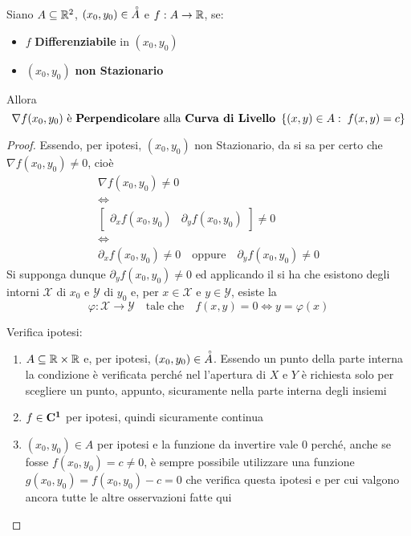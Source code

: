 \begin{proposition}
	\label{prop:curv_liv_perp_grad}
	Siano $A \subseteq \mathbb{R}^2$, $(x_0, y_0) \in \accentset{\circ}{A}$ e $f: A \to \mathbb{R}$, se:
	\begin{itemize}
		\item $f$ \textbf{Differenziabile} in $(x_0, y_0)$
		\item $(x_0, y_0)$ \textbf{non Stazionario}
	\end{itemize}
	Allora
	\[\nabla f(x_0, y_0) \text{ è \textbf{Perpendicolare} alla \textbf{Curva di Livello} } \left\{(x,y) \in A:\; f(x,y) = c\right\}\]
	\begin{proof}
		Essendo, per ipotesi, $(x_0, y_0)$ non Stazionario, da  si sa per certo che $\nabla f(x_0, y_0) \neq 0$, cioè
		\[
			\begin{gathered}
				\nabla f(x_0, y_0) \neq 0\\
				\iff\\
				\begin{bmatrix}
					\partial_x f(x_0, y_0) & \partial_y f(x_0, y_0)
				\end{bmatrix}
				\neq 0\\
				\iff\\
				\partial_x f(x_0, y_0) \neq 0 \quad \text{oppure} \quad \partial_y f(x_0, y_0) \neq 0
			\end{gathered}
		\]
		Si supponga dunque $\partial_y f(x_0,y_0) \neq 0$ ed applicando il  si ha che esistono degli intorni $\mathcal{X}$ di $x_0$ e $\mathcal{Y}$ di $y_0$ e, per $x \in \mathcal{X}$ e $y \in \mathcal{Y}$, esiste la
		\[\varphi: \mathcal{X} \to \mathcal{Y} \quad \text{tale che} \quad f(x,y) = 0 \iff y = \varphi(x)\]
		\vspace*{-\baselineskip}
		\begin{note}
			Verifica ipotesi:
			\begin{enumerate}
				\item $A \subseteq \mathbb{R} \times \mathbb{R}$ e, per ipotesi, $(x_0, y_0) \in \accentset{\circ}{A}$. Essendo un punto della parte interna la condizione è verificata perché nel  l'apertura di $X$ e $Y$ è richiesta solo per scegliere un punto, appunto, sicuramente nella parte interna degli insiemi
				\item $f \in \mathbf{C^{1}}$ per ipotesi, quindi sicuramente continua
				\item $(x_0, y_0) \in A$ per ipotesi e la funzione da invertire vale $0$ perché, anche se fosse $f(x_0, y_0) = c \neq 0$, è sempre possibile utilizzare una funzione $g(x_0, y_0) = f(x_0, y_0) - c = 0$ che verifica questa ipotesi e per cui valgono ancora tutte le altre osservazioni fatte qui

\end{enumerate}
\end{note}
\end{proof}
\end{proposition}
